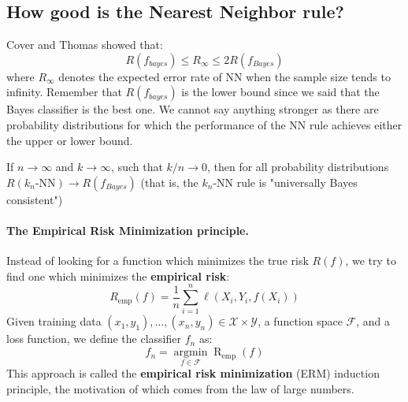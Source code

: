 \subsection{How good is the Nearest Neighbor rule?} Cover and Thomas showed that:
$$R(f_{bayes}) \leq R_\infty \leq 2R(f_{Bayes})$$
where $R_{\infty}$ denotes the expected error rate of NN when the sample size tends to infinity. Remember that $R(f_{bayes})$ is the lower bound since we said that the Bayes classifier is the best one. We cannot say anything stronger as there are probability distributions for which the performance of the NN rule achieves either the upper or lower bound. 
\begin{thm}
	If $n \rightarrow \infty$ and $k \rightarrow \infty$, such that $k/n \rightarrow 0$, then for all probability distributions $R(k_n\text{-NN}) \rightarrow R(f_{Bayes})$ (that is, the $k_n$-NN rule is "universally Bayes consistent")
\end{thm}

\paragraph*{The Empirical Risk Minimization principle.} Instead of looking for a function which minimizes the true risk $R(f)$, we try to find one which minimizes the \textbf{empirical risk}:
$$R _ { \mathrm { emp } } ( f ) = \frac { 1 } { n } \sum _ { i = 1 } ^ { n } \ell \left( X _ { i } , Y _ { i } , f \left( X _ { i } \right) \right)$$
Given training data $(x_1,y_1), \dots, (x_n, y_n) \in \mathcal{X} \times \mathcal{Y}$, a function space $\mathcal{F}$, and a loss function, we define the classifier $f_n$ as:
$$f _ { n } = \underset { f \in \mathcal { F } } { \operatorname { argmin } } \operatorname { R } _ { \mathrm { emp } } ( f )$$
This approach is called the \textbf{empirical risk minimization} (ERM) induction principle, the motivation of which comes from the law of large numbers.

